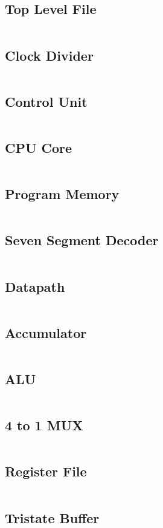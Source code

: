 \documentclass[12pt]{article}
\begin{document}
\subsection{Top Level File}
\inputminted{vhdl}{../src/Lab3_top.vhd}

\pagebreak
\subsection{Clock Divider}
\inputminted{vhdl}{../src/ClockDivider.vhd}

\pagebreak
\subsection{Control Unit}
\inputminted{vhdl}{../src/ControlUnit.vhd}

\pagebreak
\subsection{CPU Core}
\inputminted{vhdl}{../src/CpuCore.vhd}

\pagebreak
\subsection{Program Memory}
\inputminted{vhdl}{../src/ProgMem.vhd}

\pagebreak
\subsection{Seven Segment Decoder}
\inputminted{vhdl}{../src/SevenSegmentDecoder.vhd}

\pagebreak
\subsection{Datapath}
\inputminted{vhdl}{../src/datapath/Datapath.vhd}

\pagebreak
\subsection{Accumulator}
\inputminted{vhdl}{../src/datapath/Accumulator.vhd}

\pagebreak
\subsection{ALU}
\inputminted{vhdl}{../src/datapath/ALU.vhd}

\pagebreak
\subsection{4 to 1 MUX}
\inputminted{vhdl}{../src/datapath/MUX4.vhd}

\pagebreak
\subsection{Register File}
\inputminted{vhdl}{../src/datapath/RegisterFile.vhd}

\pagebreak
\subsection{Tristate Buffer}
\inputminted{vhdl}{../src/datapath/TristateBuffer.vhd}
\end{document}
